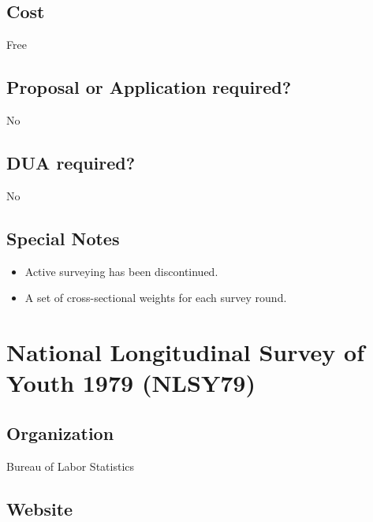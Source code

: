 \documentclass[
]{book}
\providecommand{\tightlist}{%
  \setlength{\itemsep}{0pt}\setlength{\parskip}{0pt}}
\begin{document}
\hypertarget{cost-57}{%
\section{Cost}\label{cost-57}}

Free

\hypertarget{proposal-or-application-required-57}{%
\section{Proposal or Application required?}\label{proposal-or-application-required-57}}

No

\hypertarget{dua-required-57}{%
\section{DUA required?}\label{dua-required-57}}

No

\hypertarget{special-notes-57}{%
\section{Special Notes}\label{special-notes-57}}

\begin{itemize}
\tightlist
\item
  Active surveying has been discontinued.
\item
  A set of cross-sectional weights for each survey round.
\end{itemize}

\mainmatter

\hypertarget{national-longitudinal-survey-of-youth-1979-nlsy79}{%
\chapter{National Longitudinal Survey of Youth 1979 (NLSY79)}\label{national-longitudinal-survey-of-youth-1979-nlsy79}}

\hypertarget{organization-58}{%
\section{Organization}\label{organization-58}}

Bureau of Labor Statistics

\hypertarget{website-58}{%
\section{Website}\label{website-58}}
\end{document}
